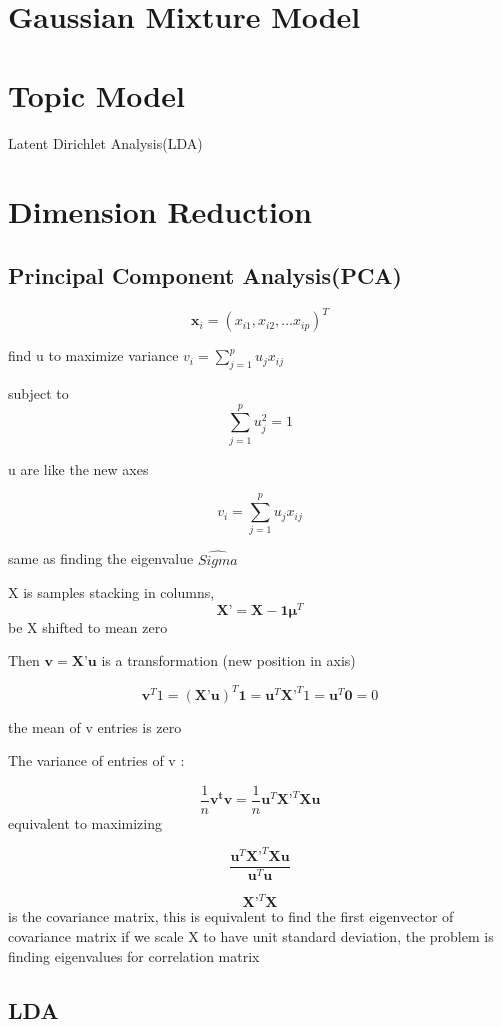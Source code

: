 \documentclass[11pt, openany]{book}              %
\begin{document}
\chapter{Gaussian Mixture Model}

\chapter{Topic Model}
Latent Dirichlet Analysis(LDA)


\chapter{Dimension Reduction}
\section{Principal Component Analysis(PCA)}

$$\mathbf{x}_i = (x_{i1},x_{i2},…x_{ip})^T$$

find u to maximize variance  $v_i = \sum_{j=1}^p u_j x_{ij}$

subject to $$\sum_{j=1}^p u_j^2 = 1$$

u are like the new axes 

$$v_i = \sum_{j=1}^p u_j x_{ij}$$

same as finding the eigenvalue $\hat{Sigma}$

X is samples stacking in columns,
 $$\mathbf{X}’ = \mathbf{X} - \mathbf{1}\mathbold{\mu}^T$$ be X shifted to mean zero

Then $\mathbf{v} = \mathbf{X}’ \mathbf{u}$ is a transformation (new position in axis)

$$\mathbf{v}^T 1 = (\mathbf{X}’\mathbf{u})^T \mathbf{1} = \mathbf{u}^T \mathbf{X}’^T 1 =  \mathbf{u}^T  \mathbf{0} = 0$$

the mean of v entries is zero 

The variance of entries of v : 

$$\frac{1}{n}\mathbf{v^tv} =  \frac{1}{n} \mathbf{u}^T\mathbf{X}’^T\mathbf{X} \mathbf{u}$$
equivalent to maximizing 

$$\frac{ \mathbf{u}^T\mathbf{X}’^T\mathbf{X} \mathbf{u}}{ \mathbf{u}^T \mathbf{u}}$$  

$$\mathbf{X}’^T\mathbf{X}$$ is the covariance matrix, this is equivalent to find the first eigenvector of covariance matrix
if we scale X to have unit standard deviation, the problem is finding eigenvalues for correlation matrix 


\section{LDA}
\end{document}
